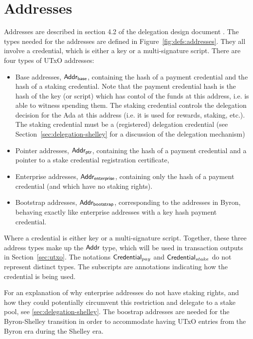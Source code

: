 \section{Addresses}
\label{sec:addresses}

Addresses are described in section 4.2 of the delegation design document \cite{delegation_design}.
The types needed for the addresses are defined in Figure~\ref{fig:defs:addresses}.
They all involve a credential, which is either a key or a multi-signature script.
There are four types of UTxO addresses:
\begin{itemize}
\item Base addresses, $\mathsf{Addr_{base}}$, containing the hash of a payment credential and
  the hash of a staking credential. Note that the payment credential hash is the
  hash of the key (or script) which has contol of the funds at this address,
  i.e. is able to witness spending
  them. The staking credential controls the delegation
  decision for the Ada at this address (i.e. it is used for rewards, staking,
  etc.).
  The staking credential
  must be a (registered) delegation credential (see Section~\ref{sec:delegation-shelley}
  for a discussion of the delegation mechanism)
\item Pointer addresses, $\mathsf{Addr_{ptr}}$, containing the hash of a payment credential
  and a pointer to a stake credential registration certificate,
\item Enterprise addresses, $\mathsf{Addr_{enterprise}}$,
  containing only the hash of a payment credential (and which have no staking rights).
\item Bootstrap addresses, $\mathsf{Addr_{bootstrap}}$, corresponding to the addresses in
  Byron, behaving exactly like enterprise addresses with a key hash
  payment credential.
\end{itemize}

\noindent Where a credential is either key or a multi-signature script. Together, these
three address types make up the $\mathsf{Addr}$ type, which will be used in transaction
outputs in Section~\ref{sec:utxo}. The notations
$\mathsf{Credential}_{pay}$ and $\mathsf{Credential}_{stake}$ do not represent distinct types.
The subscripts are annotations indicating how the credential is being used.

For an explanation of why enterprise addresses do not have staking rights,
and how they could potentially circumvent this restriction and delegate to a
stake pool, see \ref{sec:delegation-shelley}.
The boostrap addresses are needed for the Byron-Shelley transition in order to
accommodate having UTxO entries from the Byron era during the Shelley era.

